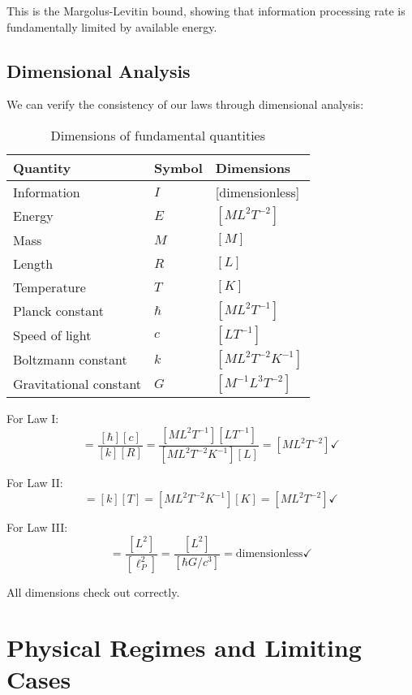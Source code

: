 \documentclass[11pt,a4paper]{article}
\theoremstyle{plain}
\theoremstyle{definition}
\theoremstyle{remark}
\begin{document}
This is the Margolus-Levitin bound, showing that information processing rate is fundamentally limited by available energy.

\subsection{Dimensional Analysis}

We can verify the consistency of our laws through dimensional analysis:

\begin{table}[h]
\centering
\begin{tabular}{lll}
\hline
Quantity & Symbol & Dimensions \\
\hline
Information & $I$ & [dimensionless] \\
Energy & $E$ & $[M L^2 T^{-2}]$ \\
Mass & $M$ & $[M]$ \\
Length & $R$ & $[L]$ \\
Temperature & $T$ & $[K]$ \\
Planck constant & $\hbar$ & $[M L^2 T^{-1}]$ \\
Speed of light & $c$ & $[L T^{-1}]$ \\
Boltzmann constant & $k$ & $[M L^2 T^{-2} K^{-1}]$ \\
Gravitational constant & $G$ & $[M^{-1} L^3 T^{-2}]$ \\
\hline
\end{tabular}
\caption{Dimensions of fundamental quantities}
\end{table}

For Law I:
\begin{equation}
[E] = \frac{[\hbar][c]}{[k][R]} = \frac{[ML^2T^{-1}][LT^{-1}]}{[ML^2T^{-2}K^{-1}][L]} = [ML^2T^{-2}] \checkmark
\end{equation}

For Law II:
\begin{equation}
[E] = [k][T] = [ML^2T^{-2}K^{-1}][K] = [ML^2T^{-2}] \checkmark
\end{equation}

For Law III:
\begin{equation}
[I] = \frac{[L^2]}{[\ell_P^2]} = \frac{[L^2]}{[\hbar G/c^3]} = \text{dimensionless} \checkmark
\end{equation}

All dimensions check out correctly.

\section{Physical Regimes and Limiting Cases}
\label{sec:regimes}
\end{document}

